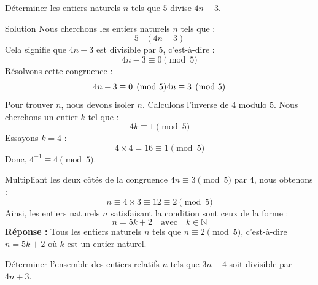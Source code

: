 \documentclass[a4paper,12pt]{article}
\begin{document}
\begin{exercice}[title=Exercice 1 $\quad \star \star \quad$ { [Calculer] }]
Déterminer les entiers naturels \( n \) tels que \( 5 \) divise \( 4n - 3 \).
\end{exercice}

\begin{solutionbox}{Solution}
Nous cherchons les entiers naturels \( n \) tels que :
\[
5 \mid (4n - 3)
\]
Cela signifie que \( 4n - 3 \) est divisible par \( 5 \), c’est-à-dire :
\[
4n - 3 \equiv 0 \pmod{5}
\]
Résolvons cette congruence :
\[
4n - 3 \equiv 0 \pmod{5} \\
4n \equiv 3 \pmod{5}
\]
Pour trouver \( n \), nous devons isoler \( n \). Calculons l’inverse de \( 4 \) modulo \( 5 \). Nous cherchons un entier \( k \) tel que :
\[
4k \equiv 1 \pmod{5}
\]
Essayons \( k = 4 \) :
\[
4 \times 4 = 16 \equiv 1 \pmod{5}
\]
Donc, \( 4^{-1} \equiv 4 \pmod{5} \).

Multipliant les deux côtés de la congruence \( 4n \equiv 3 \pmod{5} \) par \( 4 \), nous obtenons :
\[
n \equiv 4 \times 3 \equiv 12 \equiv 2 \pmod{5}
\]
Ainsi, les entiers naturels \( n \) satisfaisant la condition sont ceux de la forme :
\[
n = 5k + 2 \quad \text{avec} \quad k \in \mathbb{N}
\]
\textbf{Réponse :} Tous les entiers naturels \( n \) tels que \( n \equiv 2 \pmod{5} \), c’est-à-dire \( n = 5k + 2 \) où \( k \) est un entier naturel.
\end{solutionbox}

\begin{exercice}[title=Exercice 2 $\quad \star \star \quad$ { [Calculer] }]
Déterminer l’ensemble des entiers relatifs \( n \) tels que \( 3n + 4 \) soit divisible par \( 4n + 3 \).
\end{exercice}
\end{document}
